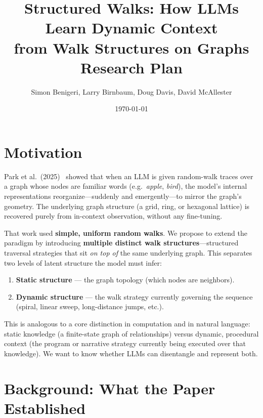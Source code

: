\documentclass[11pt]{article}
\title{\textbf{Structured Walks: How LLMs Learn Dynamic Context\\from Walk Structures on Graphs}\\[0.5em]
\large Research Plan}
\author{Simon Benigeri, Larry Birnbaum, Doug Davis, David McAllester}
\date{\today}
\begin{document}
\maketitle
\tableofcontents
\newpage

\section{Motivation}

Park et al.\ (2025)~\cite{park2025iclr} showed that when an LLM is given random-walk traces over a graph whose nodes are familiar words (e.g.\ \emph{apple}, \emph{bird}), the model's internal representations reorganize---suddenly and emergently---to mirror the graph's geometry. The underlying graph structure (a grid, ring, or hexagonal lattice) is recovered purely from in-context observation, without any fine-tuning.

That work used \textbf{simple, uniform random walks}. We propose to extend the paradigm by introducing \textbf{multiple distinct walk structures}---structured traversal strategies that sit \emph{on top of} the same underlying graph. This separates two levels of latent structure the model must infer:

\begin{enumerate}
    \item \textbf{Static structure} --- the graph topology (which nodes are neighbors).
    \item \textbf{Dynamic structure} --- the walk strategy currently governing the sequence (spiral, linear sweep, long-distance jumps, etc.).
\end{enumerate}

This is analogous to a core distinction in computation and in natural language: static knowledge (a finite-state graph of relationships) versus dynamic, procedural context (the program or narrative strategy currently being executed over that knowledge). We want to know whether LLMs can disentangle and represent both.

\section{Background: What the Paper Established}
\end{document}
